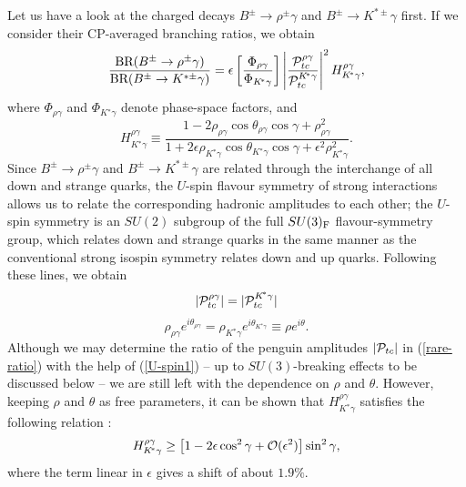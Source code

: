 \documentclass[11pt]{cernrep}
\begin{document}
Let us have a look at the charged decays $B^\pm \to \rho^{\pm} \gamma$ 
and $B^\pm \to K^{\ast\pm} \gamma$ first. If we consider their 
CP-averaged branching ratios, we obtain
\begin{equation}\label{rare-ratio}
\frac{\mbox{BR}(B^\pm \to \rho^{\pm} 
\gamma)}{\mbox{BR}(B^\pm \to K^{\ast\pm} \gamma)}=\epsilon
\left[\frac{\Phi_{\rho\gamma}}{\Phi_{K\!^\ast\gamma}}\right]
\left|\frac{{\cal P}_{tc}^{\rho\gamma}}{{\cal P}_{tc}^{K\!^\ast\gamma}}
\right|^2 H^{\rho\gamma}_{K\!^\ast\gamma},
\end{equation}
where $\Phi_{\rho\gamma}$ and $\Phi_{K\!^\ast\gamma}$ denote phase-space 
factors, and 
\begin{equation}
H^{\rho\gamma}_{K\!^\ast\gamma}\equiv
\frac{1-2\rho_{\rho\gamma}\cos\theta_{\rho\gamma}\cos\gamma+
\rho_{\rho\gamma}^2}{1+2\epsilon\rho_{K\!^\ast\gamma}
\cos\theta_{K\!^\ast\gamma}
\cos\gamma+\epsilon^2\rho_{K\!^\ast\gamma}^2}.
\end{equation}
Since $B^\pm \to \rho^{\pm} \gamma$ and $B^\pm \to K^{\ast\pm} \gamma$ 
are related through the interchange of all down and strange quarks, 
the $U$-spin flavour symmetry of strong interactions allows us to relate 
the corresponding hadronic amplitudes to each other; the $U$-spin
symmetry is an $SU(2)$ subgroup of the full $SU(3)_{\rm F}$ flavour-symmetry
group, which relates down and strange quarks in the same manner as the 
conventional strong isospin symmetry relates down and up quarks. Following 
these lines, we obtain
\begin{equation}\label{U-spin1}
|{\cal P}_{tc}^{\rho\gamma}|=|{\cal P}_{tc}^{K\!^\ast\gamma}|
\end{equation}
\begin{equation}\label{U-spin2}
\rho_{\rho\gamma}e^{i\theta_{\rho\gamma}}=
\rho_{K\!^\ast\gamma}e^{i\theta_{K\!^\ast\gamma}}\equiv
\rho e^{i\theta}.
\end{equation}
Although we may determine the ratio of the penguin amplitudes 
$|{\cal P}_{tc}|$ in (\ref{rare-ratio}) with the help of  (\ref{U-spin1}) -- up to 
$SU(3)$-breaking effects to be discussed below -- we are still left
with the dependence on $\rho$ and $\theta$. However, keeping $\rho$ 
and $\theta$ as free parameters, it can be shown that
$H^{\rho\gamma}_{K\!^\ast\gamma}$ satisfies the following relation \cite{FR2}:
\begin{equation}\label{H-bound}
H^{\rho\gamma}_{K\!^\ast\gamma}\geq \left[1-2\epsilon
\cos^2\gamma+{\cal O}(\epsilon^2)\right]\sin^2\gamma,
\end{equation}
where the term linear in $\epsilon$ gives a shift of about $1.9\%$. 
\end{document}
